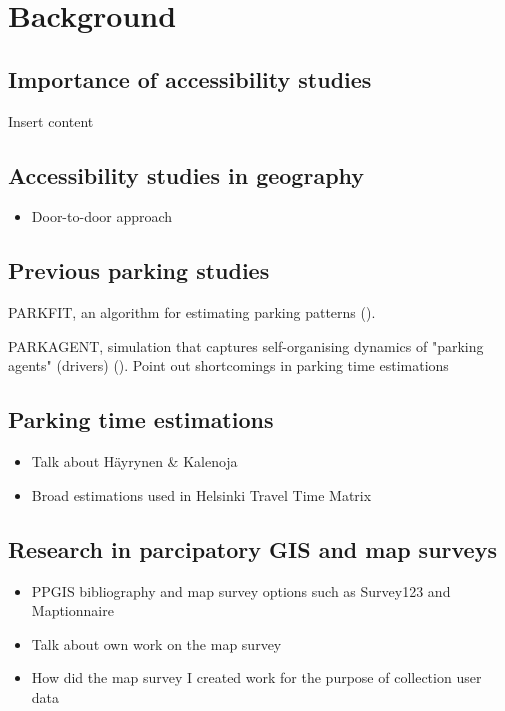 \section{Background}

\subsection{Importance of accessibility studies}
\justify
Insert content

\subsection{Accessibility studies in geography}
\justify
\begin{itemize}
  \item Door-to-door approach
\end{itemize}

\subsection{Previous parking studies}
\justify
PARKFIT, an algorithm for estimating parking patterns (\cite{Levy2015}).

PARKAGENT, simulation that captures self-organising dynamics of "parking agents" (drivers) (\cite{Benenson2008}). Point out shortcomings in parking time estimations

\subsection{Parking time estimations}
\justify
\begin{itemize}
  \item Talk about Häyrynen \& Kalenoja
  \item Broad estimations used in Helsinki Travel Time Matrix
\end{itemize}

\subsection{Research in parcipatory GIS and map surveys}
\justify
\begin{itemize}
  \item PPGIS bibliography and map survey options such as Survey123 and Maptionnaire
  \item Talk about own work on the map survey
  \item How did the map survey I created work for the purpose of collection user data
\end{itemize}